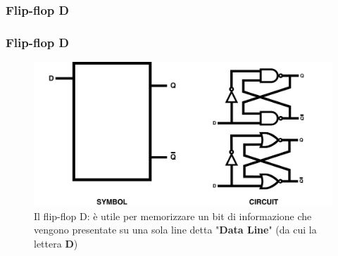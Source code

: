 \subsubsection[Flip-flop D]{Flip-flop D}
\begin{frame}
	\frametitle{Flip-flop D}
	 
	\begin{figure}[!htbp] 
		\centering
		\includegraphics[width=0.75\linewidth]{images/5_memory/flip_flop_d.pdf}
		\caption{Il flip-flop D: è utile per memorizzare un bit di informazione che vengono presentate su una sola line detta "\textbf{Data Line}" (da cui la lettera \textbf{D})}
	\end{figure}
	
\end{frame}




